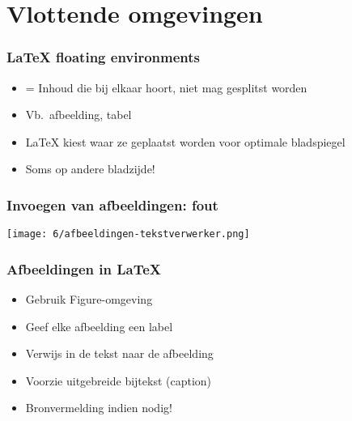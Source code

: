 \documentclass[aspectratio=169]{beamer}
\begin{document}
\section{Vlottende omgevingen}

\begin{frame}
  \frametitle{{\LaTeX} floating environments}

  \begin{itemize}
    \item = Inhoud die bij elkaar hoort, niet mag gesplitst worden
    \item Vb.\ afbeelding, tabel
    \item {\LaTeX} kiest waar ze geplaatst worden voor optimale bladspiegel
    \item Soms op andere bladzijde!
  \end{itemize}

\end{frame}

\begin{frame}
  \frametitle{Invoegen van afbeeldingen: fout}

  \centering
  \texttt{[image: 6/afbeeldingen-tekstverwerker.png]}

\end{frame}

\begin{frame}
  \frametitle{Afbeeldingen in {\LaTeX}}

  \begin{itemize}
    \item Gebruik Figure-omgeving
    \item Geef elke afbeelding een label
    \item Verwijs in de tekst naar de afbeelding
    \item Voorzie uitgebreide bijtekst (caption)
    \item Bronvermelding indien nodig!
  \end{itemize}

\end{frame}
\end{document}
